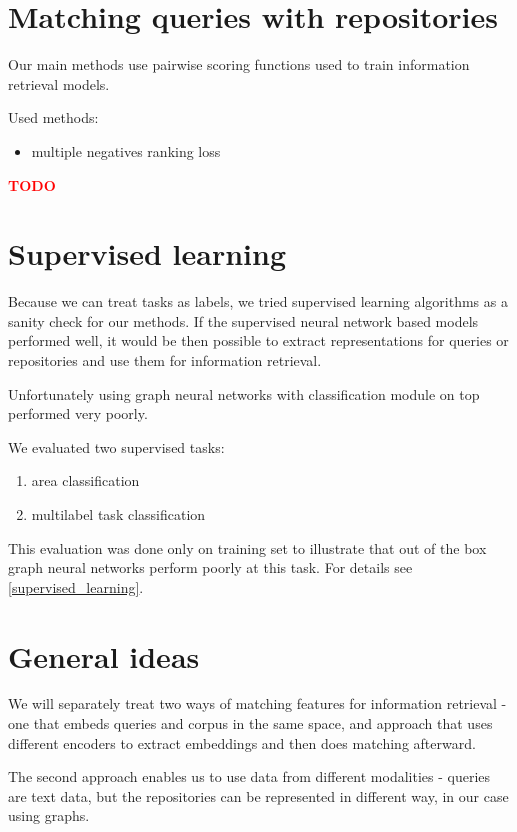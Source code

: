 \documentclass[longabstract,mgr,english]{iithesis}
\newcommand{\TODO}{\textcolor{red}{\huge{TODO}}}
\begin{document}
\section{Matching queries with repositories}

Our main methods use pairwise scoring functions used to train information retrieval models.

Used methods:
\begin{itemize}
    \item multiple negatives ranking loss
\end{itemize}

\textbf{\textcolor{red}{\TODO}}


\section{Supervised learning}

Because we can treat tasks as labels, we tried supervised learning
algorithms as a sanity check for our methods. If the supervised neural network
based models performed
well, it would be then possible to extract representations for queries or
repositories and use them for information retrieval.

Unfortunately using graph neural networks with classification module
on top performed very poorly.

We evaluated two supervised tasks:

\begin{enumerate}
\item area classification
\item multilabel task classification
\end{enumerate}

This evaluation was done only on training set to illustrate that out of the box
graph neural networks perform poorly at this task. For details see \ref{supervised_learning}.

\section{General ideas}

We will separately treat two ways of matching features for information retrieval
- one that embeds queries and corpus in the same space, and approach that uses
different encoders to extract embeddings and then does matching afterward.

The second approach enables us to use data from different modalities - queries
are text data, but the repositories can be represented in different way, in our
case using graphs.
\end{document}
